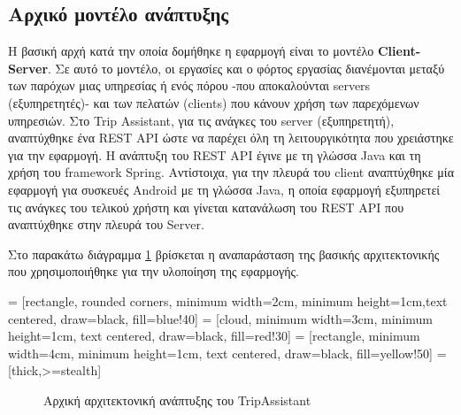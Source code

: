 \documentclass[oneside, 12pt]{book}
\begin{document}
\subsection{Αρχικό μοντέλο ανάπτυξης}
Η βασική αρχή κατά την οποία δομήθηκε η εφαρμογή είναι το μοντέλο \textbf{Client-Server}.
Σε αυτό το μοντέλο, οι εργασίες και ο φόρτος εργασίας διανέμονται 
μεταξύ των παρόχων μιας υπηρεσίας ή ενός πόρου -που αποκαλούνται 
servers (εξυπηρετητές)- και των πελατών (clients) που κάνουν χρήση των 
παρεχόμενων υπηρεσιών.
Στο Trip Assistant, για τις ανάγκες του server (εξυπηρετητή), 
αναπτύχθηκε ένα REST API ώστε να παρέχει όλη τη λειτουργικότητα που 
χρειάστηκε για την εφαρμογή. Η ανάπτυξη του REST API έγινε με τη 
γλώσσα Java και τη χρήση του framework Spring. 
Αντίστοιχα, για την πλευρά του client αναπτύχθηκε μία εφαρμογή για 
συσκευές Android με τη γλώσσα Java, η οποία εφαρμογή εξυπηρετεί τις 
ανάγκες του τελικού χρήστη και γίνεται κατανάλωση του REST API που 
αναπτύχθηκε στην πλευρά του Server.

Στο παρακάτω διάγραμμα \ref{fig:base_architecture} βρίσκεται η αναπαράσταση της βασικής αρχιτεκτονικής που χρησιμοποιήθηκε για την υλοποίηση της εφαρμογής.

 = [rectangle, rounded corners, minimum width=2cm, minimum height=1cm,text centered, draw=black, fill=blue!40]
 = [cloud, minimum width=3cm, minimum height=1cm, text centered, draw=black, fill=red!30]
 = [rectangle, minimum width=4cm, minimum height=1cm, text centered, draw=black, fill=yellow!50]
 = [thick,>=stealth]

\begin{figure}[h]
\caption{Αρχική αρχιτεκτονική ανάπτυξης του TripAssistant\label{fig:base_architecture}}
\end{figure}
\end{document}
